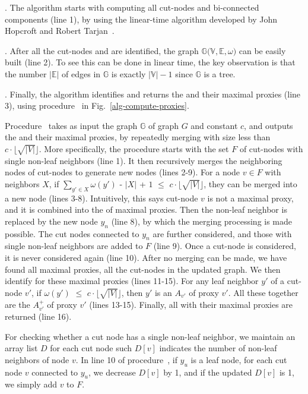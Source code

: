 .
%
The algorithm starts with computing all cut-nodes and bi-connected components (line 1), by using the linear-time algorithm developed by
John Hopcroft and Robert Tarjan~\cite{CormenLRS01,HopcroftT73-cut-nodes}.

.
%
After all the cut-nodes and \bccs are identified, the \bcsketch graph $\mathbb{G(V, E}, \omega)$ can be easily built (line 2).
To see this can be done in linear time, the key observation is that the number $|\mathbb{E}|$ of edges in $\mathbb{G}$ is
exactly $|\mathbb{V}| - 1$ since $\mathbb{G}$ is a tree.

.
%
Finally, the algorithm identifies and returns the \dras and their maximal proxies (line 3), using
procedure~ in Fig.~\ref{alg-compute-proxies}.

Procedure~ takes as input the \bcsketch graph $\mathbb{G}$ of graph $G$ and constant $c$,
and outputs the \dras and their maximal proxies, by repeatedly merging \bccs with size less than $c\cdot\lfloor\sqrt{|V|}\rfloor$.
More specifically, the procedure starts with the set $F$ of cut-nodes with single non-leaf neighbors (line 1).
It then recursively merges the neighboring \bc nodes of cut-nodes to generate new \bc nodes (lines 2-9).
For a node $v\in F$ with neighbors $X$, if $\sum_{y'\in X}\omega(y')$ - $|X|$ + $1$ $\le$ $c\cdot\lfloor\sqrt{|V|}\rfloor$,
they can be merged into a new \bc node (lines 3-8). Intuitively, this says cut-node $v$ is not a maximal proxy, and it is combined into the \dras of maximal proxies. Then the non-leaf neighbor is replaced by the new \bc node $y_n$ (line 8), by which the merging processing is made possible.
The cut nodes connected to $y_{n}$ are further considered, and those with single non-leaf neighbors are added to $F$ (line 9).
%
Once a cut-node is considered, it is never considered again (line 10).
%
After no merging can be made, we have found all maximal proxies, \ie all the cut-nodes in the updated \bcsketch graph.
We then identify \dras for these maximal proxies (lines 11-15). For any leaf neighbor $y'$ of a cut-node $v'$,
if $\omega(y')$ $\le$ $c\cdot\lfloor\sqrt{|V|}\rfloor$, then $y'$ is an $A_{v'}$ of proxy $v'$.
All these together are the $A^+_{v'}$ of proxy $v'$ (lines 13-15). Finally, all \dras with their maximal proxies are returned (line 16).

For checking whether a cut node has a single non-leaf neighbor, we maintain an array list $D$ for each cut node such $D[v]$ indicates the number of non-leaf neighbors of node $v$. In line 10 of procedure~, if $y_{u}$ is a leaf node, for each cut node $v$ connected to $y_{u}$, we decrease $D[v]$ by 1, and if the updated $D[v]$ is 1, we simply add $v$ to $F$.

